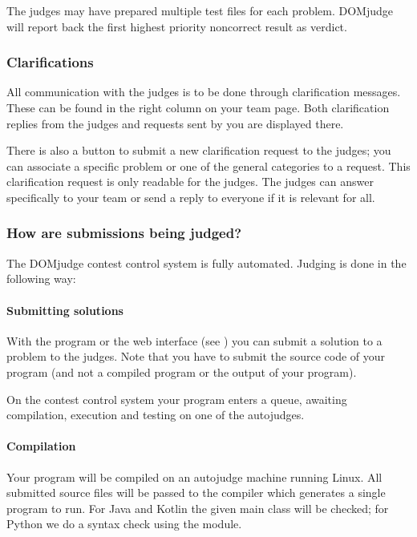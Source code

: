 \documentclass[a4paper,10pt,english,openany]{sphinxmanual}
\begin{document}
\sphinxAtStartPar
The judges may have prepared multiple test files for each problem.
DOMjudge will report back the first highest priority non\sphinxhyphen{}correct result as verdict.


\subsubsection{Clarifications}
\label{\detokenize{team:clarifications}}
\sphinxAtStartPar
All communication with the judges is to be done through clarification
messages.
These can be found in the right column on your team page. Both
clarification replies from the judges and requests sent by you
are displayed there.

\sphinxAtStartPar
There is also a button to submit a new clarification request to the
judges; you can associate a specific problem or one of the general
categories to a request. This clarification request is only readable
for the judges. The judges can answer specifically to your team or send a
reply to everyone if it is relevant for all.


\subsubsection{How are submissions being judged?}
\label{\detokenize{team:how-are-submissions-being-judged}}\label{\detokenize{team:judgingprocess}}
\sphinxAtStartPar
The DOMjudge contest control system is fully automated.
Judging is done in the following way:


\paragraph{Submitting solutions}
\label{\detokenize{team:id1}}
\sphinxAtStartPar
With the  program or the web interface (see
{\hyperref[\detokenize{team:submitting}]{}}) you
can submit a solution to a problem to the judges. Note that you have to submit
the source code of your program (and not a compiled program or the output of
your program).

\sphinxAtStartPar
On the contest control system your program enters a queue, awaiting compilation,
execution and testing on one of the autojudges.


\paragraph{Compilation}
\label{\detokenize{team:compilation}}
\sphinxAtStartPar
Your program will be compiled on an autojudge machine running Linux.
All submitted source files will be passed to the compiler which
generates a single program to run. For Java and Kotlin the given
main class will be checked; for Python we do a
syntax check using the  module.
\end{document}
